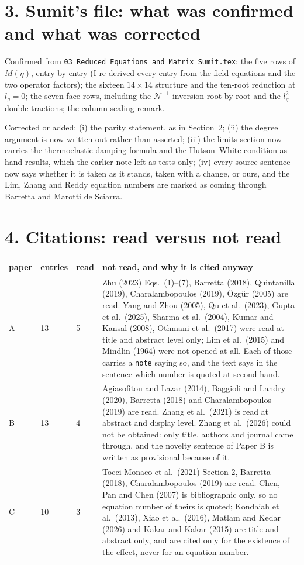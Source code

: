 \documentclass[11pt]{article}
\begin{document}
\section*{3. Sumit's file: what was confirmed and what was corrected}

Confirmed from \texttt{03\_Reduced\_Equations\_and\_Matrix\_Sumit.tex}: the five rows of $M(\eta)$, entry by
entry (I re-derived every entry from the field equations and the two operator factors); the sixteen
$14\times14$ structure and the ten-root reduction at $l_g=0$; the seven face rows, including the
$\mathcal N^{-1}$ inversion root by root and the $l_g^2$ double tractions; the column-scaling remark.

Corrected or added: (i) the parity statement, as in Section~2; (ii) the degree argument is now written out
rather than asserted; (iii) the limits section now carries the thermoelastic damping formula and the
Hutson--White condition as hand results, which the earlier note left as tests only; (iv) every source
sentence now says whether it is taken as it stands, taken with a change, or ours, and the Lim, Zhang and
Reddy equation numbers are marked as coming through Barretta and Marotti de Sciarra.

\section*{4. Citations: read versus not read}

\begin{center}
\begin{tabular}{p{2.0cm}p{1.4cm}p{1.4cm}p{8.6cm}}
\toprule
paper & entries & read & not read, and why it is cited anyway\\
\midrule
A & 13 & 5 & Zhu (2023) Eqs.~(1)--(7), Barretta (2018), Quintanilla (2019), Charalambopoulos (2019),
\"Ozg\"ur (2005) are read. Yang and Zhou (2005), Qu et al.\ (2023), Gupta et al.\ (2025), Sharma et al.\
(2004), Kumar and Kansal (2008), Othmani et al.\ (2017) were read at title and abstract level only; Lim et
al.\ (2015) and Mindlin (1964) were not opened at all. Each of those carries a \texttt{note} saying so, and
the text says in the sentence which number is quoted at second hand.\\
B & 13 & 4 & Agiasofitou and Lazar (2014), Baggioli and Landry (2020), Barretta (2018) and Charalambopoulos
(2019) are read. Zhang et al.\ (2021) is read at abstract and display level. Zhang et al.\ (2026) could not
be obtained: only title, authors and journal came through, and the novelty sentence of Paper B is written
as provisional because of it.\\
C & 10 & 3 & Tocci Monaco et al.\ (2021) Section 2, Barretta (2018), Charalambopoulos (2019) are read.
Chen, Pan and Chen (2007) is bibliographic only, so no equation number of theirs is quoted; Kondaiah et
al.\ (2013), Xiao et al.\ (2016), Matlam and Kedar (2026) and Kakar and Kakar (2015) are title and abstract
only, and are cited only for the existence of the effect, never for an equation number.\\
\bottomrule
\end{tabular}
\end{center}
\end{document}
